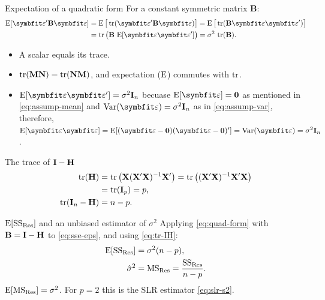 \begin{frame}{Expectation of a quadratic form}
    For a constant symmetric matrix $\mathbf{B}$:
    \begin{align}
        \E[\bvarepsilon'\mathbf{B}\bvarepsilon] &= \E\big[\tr(\bvarepsilon'\mathbf{B}\bvarepsilon)\big] = \E\big[\tr(\mathbf{B}\bvarepsilon\bvarepsilon')\big] \notag\\
        &= \tr\big(\mathbf{B}\,\E[\bvarepsilon\bvarepsilon']\big) = \sigma^2\,\tr(\mathbf{B}). \label{eq:quad-form}
    \end{align}
    \begin{itemize}
        \item A scalar equals its trace.
        \item $\operatorname{tr}(\mathbf{M}\mathbf{N})=\operatorname{tr}(\mathbf{N}\mathbf{M})$, and expectation ($\operatorname{E}$) commutes with $\operatorname{tr}$.
        \item $\E[\bvarepsilon\bvarepsilon']=\sigma^2\bI_n$ becuase \(\E[\bvarepsilon] = \bzero\) as mentioned in \eqref{eq:assump-mean} and \(\Var(\bvarepsilon) = \sigma^2\bI_n\) as in \eqref{eq:assump-var}, therefore, \(\E[\bvarepsilon\bvarepsilon] = \E[(\bvarepsilon - \bzero) (\bvarepsilon - \bzero)'] = \Var(\bvarepsilon) = \sigma^2\bI_n\).
    \end{itemize}
\end{frame}


\begin{frame}{The trace of $\mathbf{I}-\mathbf{H}$}
    \begin{align}
        \operatorname{tr}(\mathbf{H}) &= \operatorname{tr}\big(\mathbf{X}(\mathbf{X}'\mathbf{X})^{-1}\mathbf{X}'\big) = \operatorname{tr}\big((\mathbf{X}'\mathbf{X})^{-1}\mathbf{X}'\mathbf{X}\big) \notag\\
        &= \operatorname{tr}(\mathbf{I}_p) = p, \notag\\
        \operatorname{tr}(\mathbf{I}_n-\mathbf{H}) &= n-p. \label{eq:tr-IH}
    \end{align}
\end{frame}


\begin{frame}{$\operatorname{E}[\mathrm{SS}_{\mathrm{Res}}]$ and an unbiased estimator of $\sigma^2$}
    Applying \eqref{eq:quad-form} with $\mathbf{B}=\mathbf{I}-\mathbf{H}$ to \eqref{eq:sse-eps}, and using \eqref{eq:tr-IH}:
    \begin{align}
        \operatorname{E}[\mathrm{SS}_{\mathrm{Res}}] &= \sigma^2(n-p), \label{eq:E-sse}\\
        \hat\sigma^2 &= \mathrm{MS}_{\mathrm{Res}} = \frac{\mathrm{SS}_{\mathrm{Res}}}{n-p}. \label{eq:mse}
    \end{align}
    $\operatorname{E}[\mathrm{MS}_{\mathrm{Res}}]=\sigma^2$. For $p=2$ this is the SLR estimator \eqref{eq:slr-s2}.
\end{frame}



